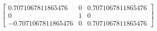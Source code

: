 \documentclass[preview]{standalone}
\begin{document}
\begin{align*}
\begin{bmatrix} 0.7071067811865476 & 0 & 0.7071067811865476 \\ 0 & 1 & 0 \\ -0.7071067811865476 & 0 & 0.7071067811865476\end{bmatrix}
\end{align*}
\end{document}
